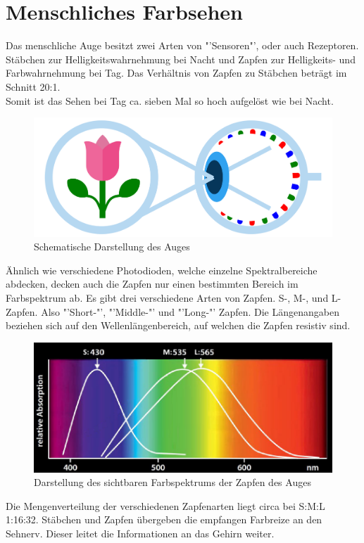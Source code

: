 \documentclass[11pt]{scrartcl}
\begin{document}
\section{Menschliches Farbsehen}
Das menschliche Auge besitzt zwei Arten von "'Sensoren"', oder auch Rezeptoren. Stäbchen zur Helligkeitswahrnehmung bei Nacht und
Zapfen zur Helligkeits- und Farbwahrnehmung bei Tag. Das Verhältnis von Zapfen zu Stäbchen beträgt im Schnitt 20:1.\\
Somit ist das Sehen bei Tag ca. sieben Mal so hoch aufgelöst wie bei Nacht.
\begin{figure}[H]
    \begin{center}
        \includegraphics[width=.8\textwidth]{images/eye.png}
    \end{center}
    \caption[Schematische Darstellung des Auges]{Schematische Darstellung des Auges \cite{wisotopTriChro}}\label{fig:eye}
\end{figure}
\noindent
Ähnlich wie verschiedene Photodioden, welche einzelne Spektralbereiche abdecken, decken auch die Zapfen nur einen
bestimmten Bereich im Farbspektrum ab. Es gibt drei verschiedene Arten von Zapfen. S-, M-, und L-Zapfen. Also "'Short-"',
"'Middle-"' und "'Long-"' Zapfen. Die Längenangaben beziehen sich auf den Wellenlängenbereich, auf welchen die Zapfen
resistiv sind.\\
\begin{figure}[H]
    \begin{center}
        \includegraphics[width=.8\textwidth]{images/eye_spectrum.png}
    \end{center}
    \caption{Darstellung des sichtbaren Farbspektrums der Zapfen des Auges}\label{fig:eye_spectrum}
\end{figure}
\noindent
Die Mengenverteilung der verschiedenen Zapfenarten liegt circa bei S:M:L 1:16:32. Stäbchen und Zapfen übergeben die
empfangen Farbreize an den Sehnerv. Dieser leitet die Informationen an das Gehirn weiter.
\clearpage
\end{document}
